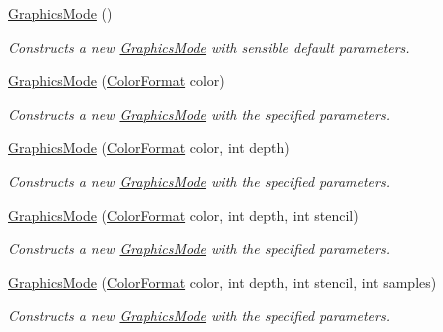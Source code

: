 \begin{DoxyCompactItemize}
\item 
\hyperlink{class_open_t_k_1_1_graphics_1_1_graphics_mode_a01c78f91fdad6efa7783442eec3fe971}{Graphics\-Mode} ()
\begin{DoxyCompactList}\small\item\em Constructs a new \hyperlink{class_open_t_k_1_1_graphics_1_1_graphics_mode}{Graphics\-Mode} with sensible default parameters.\end{DoxyCompactList}\item 
\hyperlink{class_open_t_k_1_1_graphics_1_1_graphics_mode_ab7ba79e223dd09d3e31db4047184522b}{Graphics\-Mode} (\hyperlink{struct_open_t_k_1_1_graphics_1_1_color_format}{Color\-Format} color)
\begin{DoxyCompactList}\small\item\em Constructs a new \hyperlink{class_open_t_k_1_1_graphics_1_1_graphics_mode}{Graphics\-Mode} with the specified parameters.\end{DoxyCompactList}\item 
\hyperlink{class_open_t_k_1_1_graphics_1_1_graphics_mode_a78bf911ef9b3838fdb3fef129ccbdeb8}{Graphics\-Mode} (\hyperlink{struct_open_t_k_1_1_graphics_1_1_color_format}{Color\-Format} color, int depth)
\begin{DoxyCompactList}\small\item\em Constructs a new \hyperlink{class_open_t_k_1_1_graphics_1_1_graphics_mode}{Graphics\-Mode} with the specified parameters.\end{DoxyCompactList}\item 
\hyperlink{class_open_t_k_1_1_graphics_1_1_graphics_mode_a1312dad0cf2977c26448a538e99a8586}{Graphics\-Mode} (\hyperlink{struct_open_t_k_1_1_graphics_1_1_color_format}{Color\-Format} color, int depth, int stencil)
\begin{DoxyCompactList}\small\item\em Constructs a new \hyperlink{class_open_t_k_1_1_graphics_1_1_graphics_mode}{Graphics\-Mode} with the specified parameters.\end{DoxyCompactList}\item 
\hyperlink{class_open_t_k_1_1_graphics_1_1_graphics_mode_aba66332ea57307f061437255b053115b}{Graphics\-Mode} (\hyperlink{struct_open_t_k_1_1_graphics_1_1_color_format}{Color\-Format} color, int depth, int stencil, int samples)
\begin{DoxyCompactList}\small\item\em Constructs a new \hyperlink{class_open_t_k_1_1_graphics_1_1_graphics_mode}{Graphics\-Mode} with the specified parameters.\end{DoxyCompactList}\item 

\end{DoxyCompactItemize}
